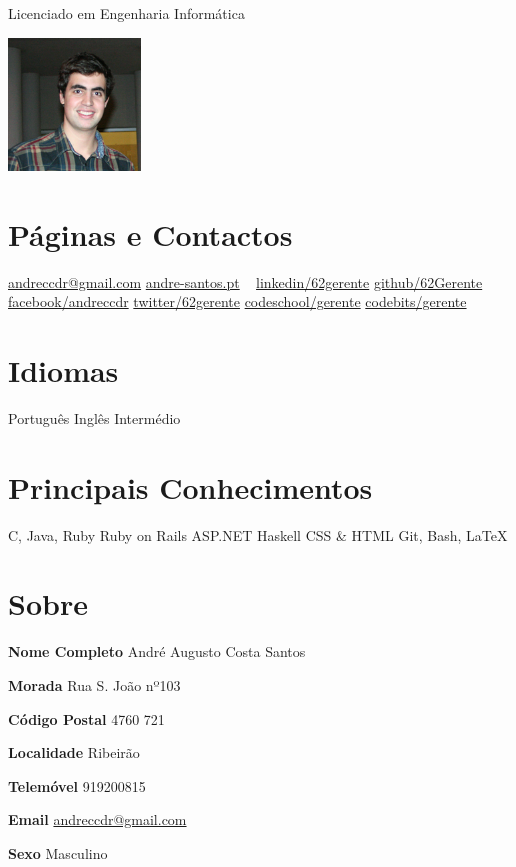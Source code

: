 \documentclass[]{friggeri-cv}
\begin{document}
       {Licenciado em Engenharia Informática}

\begin{aside}
  \includegraphics[height=100pt]{foto}
  \section{Páginas e Contactos}
    \href{mailito:andreccdr@gmail.com}{andreccdr@gmail.com}
    \href{http://andre-santos.pt}{andre-santos.pt}
    ~
    \href{http://pt.linkedin.com/in/62gerente/}{linkedin/62gerente}
    \href{https://github.com/62Gerente}{github/62Gerente}
    \href{https://www.facebook.com/andreccdr}{facebook/andreccdr}
    \href{https://twitter.com/62gerente}{twitter/62gerente}
    \href{http://www.codeschool.com/users/gerente}{codeschool/gerente}
    \href{https://codebits.eu/gerente}{codebits/gerente}
   \section{Idiomas}
    Português
    Inglês Intermédio
  \section{Principais Conhecimentos}
    C, Java, Ruby
    Ruby on Rails
    ASP.NET
    Haskell
    CSS \& HTML
    Git, Bash, \LaTeX
\end{aside}

\section{Sobre}

\textbf{Nome Completo} André Augusto Costa Santos

\begin{multicols}{3}
\textbf{Morada} Rua S. João nº103  

\textbf{Código Postal} 4760 721 

\textbf{Localidade} Ribeirão
\end{multicols}

\begin{multicols}{3}
\textbf{Telemóvel} 919200815  

\textbf{Email} \href{mailito:andreccdr@gmail.com}{andreccdr@gmail.com}

\textbf{Sexo} Masculino
\end{multicols}
\end{document}
